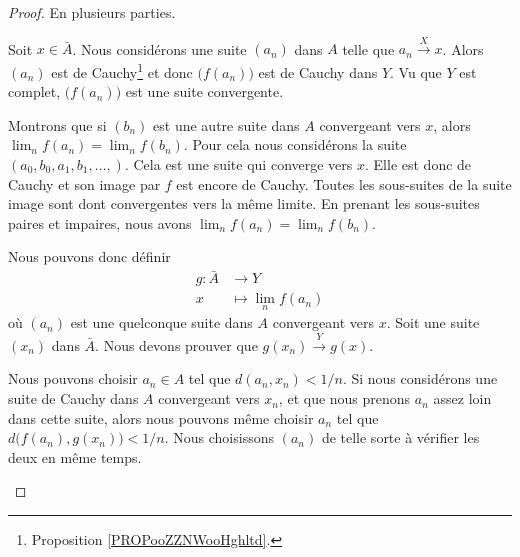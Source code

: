 \begin{proof}
	En plusieurs parties.
	\begin{subproof}

		Soit \( x\in\bar A\). Nous considérons une suite \( (a_n)\) dans \( A\) telle que \( a_n\stackrel{X}{\longrightarrow}x\). Alors \( (a_n)\) est de Cauchy\footnote{Proposition \ref{PROPooZZNWooHghltd}.} et donc \( \big( f(a_n) \big)\) est de Cauchy dans \( Y\). Vu que \( Y \) est complet, \( \big( f(a_n) \big)\) est une suite convergente.
		\spitem[Indépendance]

		Montrons que si \( (b_n)\) est une autre suite dans \( A\) convergeant vers \( x\), alors \( \lim_n f(a_n)=\lim_nf(b_n)\). Pour cela nous considérons la suite\( (a_0,b_0,a_1,b_1,\ldots, )\). Cela est une suite qui converge vers \( x\). Elle est donc de Cauchy et son image par \( f\) est encore de Cauchy. Toutes les sous-suites de la suite image sont dont convergentes vers la même limite. En prenant les sous-suites paires et impaires, nous avons \( \lim_n f(a_n)=\lim_nf(b_n)\).

		\spitem[Définition de \( g\)]
		Nous pouvons donc définir
		\begin{equation}
			\begin{aligned}
				g\colon \bar A & \to Y                 \\
				x              & \mapsto \lim_n f(a_n)
			\end{aligned}
		\end{equation}
		où \( (a_n)\) est une quelconque suite dans \( A\) convergeant vers \( x\).
		Soit une suite \( (x_n)\) dans \( \bar A\). Nous devons prouver que \( g(x_n)\stackrel{Y}{\longrightarrow}g(x)\).

		Nous pouvons choisir \( a_n\in A\) tel que \( d(a_n,x_n)<1/n\). Si nous considérons une suite de Cauchy dans \( A\) convergeant vers \( x_n\), et que nous prenons \( a_n\) assez loin dans cette suite, alors nous pouvons même choisir \( a_n\) tel que \( d\big( f(a_n),g(x_n) \big)<1/n\). Nous choisissons \( (a_n)\) de telle sorte à vérifier les deux en même temps.


\end{subproof}
\end{proof}
